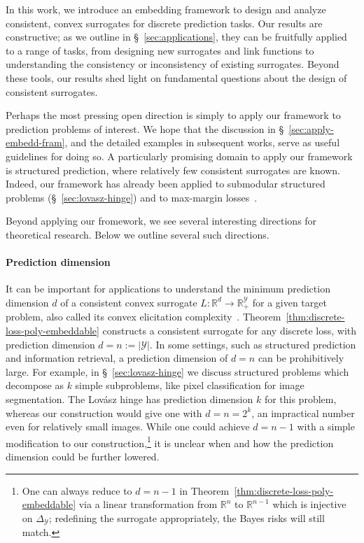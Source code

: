\documentclass[twoside,11pt]{article}
\newcommand{\reals}{\mathbb{R}}
\newcommand{\simplex}{\Delta_\Y}
\newcommand{\Y}{\mathcal{Y}}
\begin{document}
In this work, we introduce an embedding framework to design and analyze consistent, convex surrogates for discrete prediction tasks.
Our results are constructive; as we outline in \S~\ref{sec:applications}, they can be fruitfully applied to a range of tasks, from designing new surrogates and link functions to understanding the consistency or inconsistency of existing surrogates.
Beyond these tools, our results shed light on fundamental questions about the design of consistent surrogates.

Perhaps the most pressing open direction is simply to apply our framework to prediction problems of interest.
We hope that the discussion in \S~\ref{sec:apply-embedd-fram}, and the detailed examples in subsequent works, serve as useful guidelines for doing so.
A particularly promising domain to apply our framework is structured prediction, where relatively few consistent surrogates are known.
Indeed, our framework has already been applied to submodular structured problems (\S~\ref{sec:lovasz-hinge}) and to max-margin losses~\cite{nowak2022consistency}.

Beyond applying our fromework, we see several interesting directions for theoretical research.
Below we outline several such directions.



\paragraph{Prediction dimension}

It can be important for applications to understand the minimum prediction dimension $d$ of a consistent convex surrogate $L:\reals^d\to \reals^\Y_+$ for a given target problem, also called its convex elicitation complexity~\cite{frongillo2021elicitation}.
Theorem~\ref{thm:discrete-loss-poly-embeddable} constructs a consistent surrogate for any discrete loss, with prediction dimension $d = n := |\Y|$.
In some settings, such as structured prediction and information retrieval, a prediction dimension of $d=n$ can be prohibitively large.
For example, in \S~\ref{sec:lovasz-hinge} we discuss structured problems which decompose as $k$ simple subproblems, like pixel classification for image segmentation.
The Lov\'asz hinge has prediction dimension $k$ for this problem, whereas our construction would give one with $d = n = 2^k$, an impractical number even for relatively small images.
While one could achieve $d = n-1$ with a simple modification to our construction,\footnote{One can always reduce to $d=n-1$ in Theorem~\ref{thm:discrete-loss-poly-embeddable} via a linear transformation from $\reals^n$ to $\reals^{n-1}$ which is injective on $\simplex$; redefining the surrogate appropriately, the Bayes risks will still match.}
it is unclear when and how the prediction dimension could be further lowered.
\end{document}
